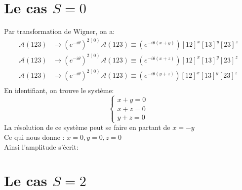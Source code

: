 \documentclass[12pt, a4paper]{article}
\begin{document}
	\section{Le cas $S=0$}
	Par transformation de Wigner, on a:
	\begin{equation}
		\begin{split}
			\mathcal{A}(123) &\rightarrow (e^{-i \theta})^{2(0)}\mathcal{A}(123)\equiv (e^{-i \theta(x+y)})[12]^x [13]^y [23]^z \\
			\mathcal{A}(123) &\rightarrow (e^{-i \theta})^{2(0)}\mathcal{A}(123)\equiv (e^{-i \theta(x+z)})[12]^x [13]^y [23]^z \\
			\mathcal{A}(123) &\rightarrow (e^{-i \theta})^{2(0)}\mathcal{A}(123)\equiv (e^{-i \theta(y+z)})[12]^x [13]^y [23]^z \\
		\end{split}
	\end{equation}
	En identifiant, on trouve le système:
	\[
	\begin{cases}
		x+y=0\\
		x+z=0\\
		y+z=0
	\end{cases}
	\]
	La résolution de ce système peut se faire en partant de $x=-y$\\
	Ce qui nous donne : $x=0, y=0, z=0$\\
	Ainsi l'amplitude s'écrit:
	\begin{center}
	\end{center} 
	
	\section{Le cas $S=2$}
\end{document}
